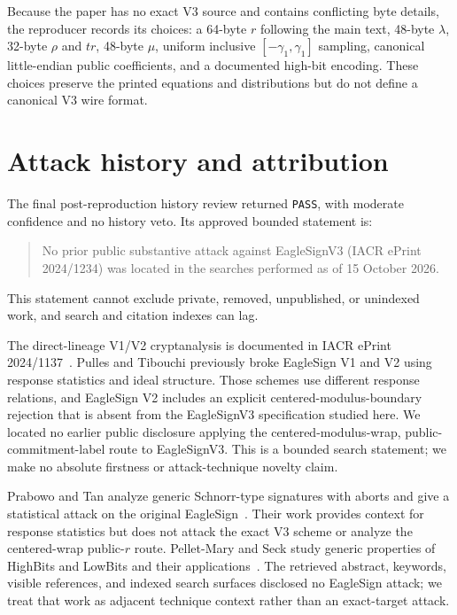 \documentclass[10pt,a4paper]{article}
\begin{document}
Because the paper has no exact V3 source and contains conflicting byte
details, the reproducer records its choices: a 64-byte $r$ following the main
text, 48-byte $\lambda$, 32-byte $\rho$ and $tr$, 48-byte $\mu$, uniform
inclusive $[-\gamma_1,\gamma_1]$ sampling, canonical little-endian public
coefficients, and a documented high-bit encoding. These choices preserve the
printed equations and distributions but do not define a canonical V3 wire
format.

\section{Attack history and attribution}
\label{sec:history}

The final post-reproduction history review returned \texttt{PASS}, with
moderate confidence and no history veto. Its approved bounded statement is:
\begin{quote}
No prior public substantive attack against EagleSignV3 (IACR ePrint
2024/1234) was located in the searches performed as of 15 October 2026.
\end{quote}
This statement cannot exclude private, removed, unpublished, or unindexed
work, and search and citation indexes can lag.

The direct-lineage V1/V2 cryptanalysis is documented in IACR ePrint
2024/1137~\cite{pullestibouchi}.
Pulles and Tibouchi previously broke EagleSign V1 and V2 using response statistics and ideal structure. Those schemes use different response relations, and EagleSign V2 includes an explicit centered-modulus-boundary rejection that is absent from the EagleSignV3 specification studied here. We located no earlier public disclosure applying the centered-modulus-wrap, public-commitment-label route to EagleSignV3. This is a bounded search statement; we make no absolute firstness or attack-technique novelty claim.

Prabowo and Tan analyze generic Schnorr-type signatures with aborts and give a
statistical attack on the original EagleSign~\cite{prabowotan}. Their work
provides context for response statistics but does not attack the exact V3
scheme or analyze the centered-wrap public-$r$ route. Pellet-Mary and Seck
study generic properties of HighBits and LowBits and their
applications~\cite{pelletmaryseck}. The retrieved abstract, keywords, visible references,
and indexed search surfaces disclosed no EagleSign attack; we treat that work
as adjacent technique context rather than an exact-target attack.
\end{document}
